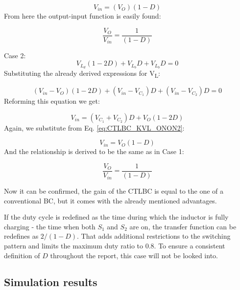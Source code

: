 \begin{equation}
	V_{in}=(V_{O})(1-D)
	\label{eq:CTLBC_IVSB4}
\end{equation}
From here the output-input function is easily found:

\begin{equation}
	\frac{V_O}{V_{in}}=\frac{1}{(1-D)}
	\label{eq:CTLBC_IVSB5}
\end{equation}

Case 2: 
\begin{equation}
	V_{L_d}(1-2D)+V_{L_b}D+V_{L_b}D=0
	\label{eq:CTLBC_CASE2}
\end{equation}
Substituting the already derived expressions for V\textsubscript{L}:

\begin{equation}
	(V_{in}-V_O)(1-2D)+(V_{in} - V_{C_1})D+(V_{in} - V_{C_2})D=0
	\label{eq:CTLBC_CASE2_2}
\end{equation}
Reforming this equation we get: 

\begin{equation}
	V_{in}=(V_{C_1} + V_{C_2})D+V_O(1-2D)
	\label{eq:CTLBC_CASE2_3}
\end{equation}
Again, we substitute from Eq. \ref{eq:CTLBC_KVL_ONON2}:

\begin{equation}
	V_{in}=V_{O}(1-D)
	\label{eq:CTLBC_CASE2_4}
\end{equation}
And the relationship is derived to be the same as in Case 1:

\begin{equation}
	\frac{V_O}{V_{in}}=\frac{1}{(1-D)}
	\label{eq:CTLBC_CASE2_5}
\end{equation}

Now it can be confirmed, the gain of the CTLBC is equal to the one of a conventional BC, but it comes with the already mentioned advantages. 

If the duty cycle is redefined as the time during which the inductor is fully charging - the time when both $S_1$ and $S_2$ are on, the transfer function can be redefines as $2/(1-D)$. That adds additional restrictions to the switching pattern and limits the maximum duty ratio to 0.8. To ensure a consistent definition of $D$ throughout the report, this case will not be looked into.  

\subsection{Simulation results}


